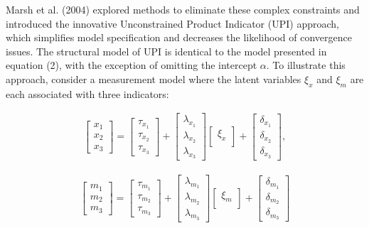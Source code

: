 \documentclass[
  man,mask]{apa6}
\begin{document}
Marsh et al. (2004) explored methods to eliminate these complex constraints and introduced the innovative Unconstrained Product Indicator (UPI) approach, which simplifies model specification and decreases the likelihood of convergence issues. The structural model of UPI is identical to the model presented in equation (2), with the exception of omitting the intercept \(\alpha\). To illustrate this approach, consider a measurement model where the latent variables \(\xi_{x}\) and \(\xi_{m}\) are each associated with three indicators:

\begin{align}
    \begin{bmatrix}
        x_{1} \\
        x_{2} \\ 
        x_{3}
    \end{bmatrix} =
    \begin{bmatrix}
        \tau_{x_{1}} \\
        \tau_{x_{2}} \\ 
        \tau_{x_{3}}
    \end{bmatrix} +
    \begin{bmatrix}
        \lambda_{x_{1}} \\
        \lambda_{x_{2}} \\ 
        \lambda_{x_{3}}
    \end{bmatrix}
    \begin{bmatrix}
        \xi_{x} \\
    \end{bmatrix} +
    \begin{bmatrix}
        \delta_{x_{1}} \\
        \delta_{x_{2}} \\ 
        \delta_{x_{3}}
    \end{bmatrix},
\end{align}

\begin{align}
    \begin{bmatrix}
        m_{1} \\
        m_{2} \\ 
        m_{3}
    \end{bmatrix} =
    \begin{bmatrix}
        \tau_{m_{1}} \\
        \tau_{m_{2}} \\ 
        \tau_{m_{3}}
    \end{bmatrix} +
    \begin{bmatrix}
        \lambda_{m_{1}} \\
        \lambda_{m_{2}} \\ 
        \lambda_{m_{3}}
    \end{bmatrix}
    \begin{bmatrix}
        \xi_{m} \\
    \end{bmatrix} +
    \begin{bmatrix}
        \delta_{m_{1}} \\
        \delta_{m_{2}} \\ 
        \delta_{m_{3}}
    \end{bmatrix}
\end{align}
\end{document}
